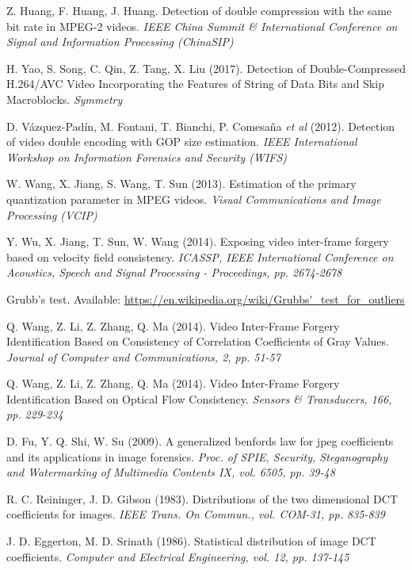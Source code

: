 \begin{thebibliography}{11}
Z. Huang, F. Huang, J. Huang. Detection of double compression with the same bit rate in MPEG-2 videos. \textit{IEEE China Summit \& International Conference on Signal and Information Processing (ChinaSIP)}

H. Yao, S. Song, C. Qin, Z. Tang, X. Liu (2017). Detection of Double-Compressed H.264/AVC Video Incorporating the Features of String of Data Bits and Skip Macroblocks. \textit{Symmetry}

D. Vázquez-Padín, M. Fontani, T. Bianchi, P. Comesa\~na \textit{et al} (2012). Detection of video double encoding with GOP size estimation. \textit{IEEE International Workshop on Information Forensics and Security (WIFS)}

W. Wang, X. Jiang, S. Wang, T. Sun (2013). Estimation of the primary quantization parameter in MPEG videos. \textit{Visual Communications and Image Processing (VCIP)}

Y. Wu, X. Jiang, T. Sun, W. Wang (2014). Exposing video inter-frame forgery based on velocity field consistency. \textit{ICASSP, IEEE International Conference on Acoustics, Speech and Signal Processing - Proceedings, pp. 2674-2678}

Grubb's test. Available: \url{https://en.wikipedia.org/wiki/Grubbs'\_test\_for\_outliers}

Q. Wang, Z. Li, Z. Zhang, Q. Ma (2014). Video Inter-Frame Forgery Identification Based on Consistency of Correlation Coefficients of Gray Values. \textit{Journal of Computer and Communications, 2, pp. 51-57}

Q. Wang, Z. Li, Z. Zhang, Q. Ma (2014). Video Inter-Frame Forgery Identification Based on Optical Flow Consistency. \textit{Sensors \& Transducers, 166, pp. 229-234}

D. Fu, Y. Q. Shi, W. Su (2009). A generalized benfords law for jpeg coefficients and its applications in image forensics. \textit{Proc. of SPIE, Security, Steganography and Watermarking of Multimedia Contents IX, vol. 6505, pp. 39-48} 

R. C. Reininger, J. D. Gibson (1983). Distributions of the two dimensional DCT coefficients for images. \textit{IEEE Trans. On Commun., vol. COM-31, pp. 835-839}

J. D. Eggerton, M. D. Srinath (1986). Statistical distribution of image DCT coefficients. \textit{Computer and Electrical Engineering, vol. 12, pp. 137-145}


\end{thebibliography}
